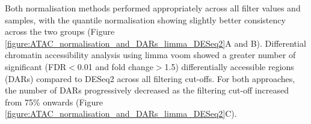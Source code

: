 

Both normalisation methods performed appropriately across all filter values and samples, with the quantile normalisation showing slightly better consistency across the two groups (Figure \ref{figure:ATAC_normalisation_and_DARs_limma_DESeq2}A and B). Differential chromatin accessibility analysis using limma voom showed a greater number of significant (FDR$<$0.01 and fold change$>$1.5) differentially accessible regions (DARs) compared to DESeq2 across all filtering cut-offs. For both approaches, the number of DARs progressively decreased as the filtering cut-off increased from 75\% onwards (Figure \ref{figure:ATAC_normalisation_and_DARs_limma_DESeq2}C).




